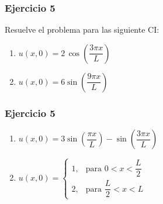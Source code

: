 \documentclass[12pt]{beamer}
\begin{document}
\begin{frame}
\frametitle{Ejercicio 5}
Resuelve el problema para las siguiente CI:
\begin{enumerate}
\item $u (x, 0) = 2 \, \cos \left( \dfrac{3 \pi x}{L} \right)$
\item $u (x, 0) = 6 \sin \left( \dfrac{9 \pi x}{L} \right)$
\seti
\end{enumerate}
\end{frame}
\begin{frame}
\frametitle{Ejercicio 5}
\begin{enumerate} 
\item $u (x, 0) = 3 \sin \left( \dfrac{\pi x}{L} \right) - \sin \left( \dfrac{3 \pi x}{L} \right)$
\item $u (x, 0) = \begin{cases}
  1, & \text{para } 0 < x < \dfrac{L}{2} \\[1em]
  2, & \text{para } \dfrac{L}{2} < x < L
\end{cases}$
\end{enumerate}
\end{frame}
\end{document}
